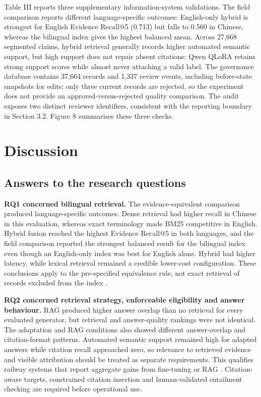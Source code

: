 Table III reports three supplementary information-system validations. The field comparison reports different language-specific outcomes: English-only hybrid is strongest for English Evidence Recall@5 (0.713) but falls to 0.560 in Chinese, whereas the bilingual index gives the highest balanced mean. Across 27,668 segmented claims, hybrid retrieval generally records higher automated semantic support, but high support does not repair absent citations: Qwen QLoRA retains strong support scores while almost never attaching a valid label. The governance database contains 37,664 records and 1,337 review events, including before-state snapshots for edits; only three current records are rejected, so the experiment does not provide an approved-versus-rejected quality comparison. The audit exposes two distinct reviewer identifiers, consistent with the reporting boundary in Section 3.2. Figure 8 summarises these three checks.

\clearpage

\section{Discussion}

\subsection{Answers to the research questions}

\textbf{RQ1 concerned bilingual retrieval.} The evidence-equivalent comparison produced language-specific outcomes. Dense retrieval had higher recall in Chinese in this evaluation, whereas exact terminology made BM25 competitive in English. Hybrid fusion reached the highest Evidence Recall@5 in both languages, and the field comparison reported the strongest balanced result for the bilingual index even though an English-only index was best for English alone. Hybrid had higher latency, while lexical retrieval remained a credible lower-cost configuration. These conclusions apply to the pre-specified equivalence rule, not exact retrieval of records excluded from the index \citep{robertson2009bm25,cormack2009rrf}.

\textbf{RQ2 concerned retrieval strategy, enforceable eligibility and answer behaviour.} RAG produced higher answer overlap than no retrieval for every evaluated generator, but retrieval and answer-quality rankings were not identical. The adaptation and RAG conditions also showed different answer-overlap and citation-format patterns. Automated semantic support remained high for adapted answers while citation recall approached zero, so relevance to retrieved evidence and visible attribution should be treated as separate requirements. This qualifies railway systems that report aggregate gains from fine-tuning or RAG \citep{li2024rschat,li2025training,luo2025driver,huang2026emergency}. Citation-aware targets, constrained citation insertion and human-validated entailment checking are required before operational use.

